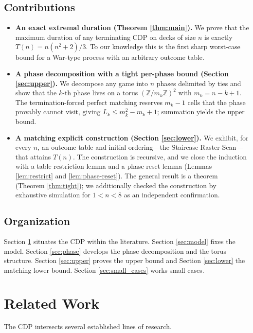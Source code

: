 \documentclass[12pt]{article}
\begin{document}
\subsection{Contributions}
\begin{itemize}[leftmargin=1.4em]
    \item \textbf{An exact extremal duration (Theorem \ref{thm:main}).} We prove that the maximum duration of any terminating CDP on decks of size $n$ is exactly $T(n)=n(n^2+2)/3$. To our knowledge this is the first sharp worst-case bound for a War-type process with an arbitrary outcome table.
    
    \item \textbf{A phase decomposition with a tight per-phase bound (Section \ref{sec:upper}).} We decompose any game into $n$ phases delimited by ties and show that the $k$-th phase lives on a torus $(\mathbb{Z}/m_k\mathbb{Z})^2$ with $m_k=n-k+1$. The termination-forced perfect matching reserves $m_k-1$ cells that the phase provably cannot visit, giving $L_k \le m_k^2-m_k+1$; summation yields the upper bound.
    
    \item \textbf{A matching explicit construction (Section \ref{sec:lower}).} We exhibit, for every $n$, an outcome table and initial ordering---the Staircase Raster-Scan---that attains $T(n)$. The construction is recursive, and we close the induction with a table-restriction lemma and a phase-reset lemma (Lemmas \ref{lem:restrict} and \ref{lem:phase-reset}). The general result is a theorem (Theorem \ref{thm:tight}); we additionally checked the construction by exhaustive simulation for $1 < n < 8$ as an independent confirmation.
\end{itemize}

\subsection{Organization}
Section \ref{sec:related} situates the CDP within the literature. Section \ref{sec:model} fixes the model. Section \ref{sec:phase} develops the phase decomposition and the torus structure. Section \ref{sec:upper} proves the upper bound and Section \ref{sec:lower} the matching lower bound. Section \ref{sec:small_cases} works small cases.

\section{Related Work}\label{sec:related}
The CDP intersects several established lines of research.
\end{document}
